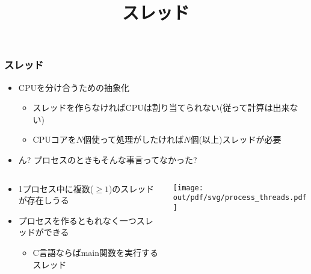 \documentclass[12pt,dvipdfmx]{beamer}
\title{スレッド}
\begin{document}
\maketitle



\begin{frame}
  \frametitle{スレッド}
  \begin{itemize}
  \item CPUを分け合うための抽象化
    \begin{itemize}
    \item スレッドを作らなければCPUは割り当てられない(従って計算は出来ない)
    \item CPUコアを$N$個使って処理がしたければ$N$個(以上)スレッドが必要
    \end{itemize}
  \item ん? プロセスのときもそんな事言ってなかった?
  \end{itemize}
  \begin{columns}
    \begin{column}{0.7\textwidth}
      \begin{itemize}
      \item 1プロセス中に複数($\geq 1$)のスレッドが存在しうる
      \item プロセスを作るともれなく一つスレッドができる
        \begin{itemize}
        \item C言語ならばmain関数を実行するスレッド
        \end{itemize}
      \end{itemize}
    \end{column}
    \begin{column}{0.3\textwidth}
      \texttt{[image: out/pdf/svg/process\_threads.pdf]}
    \end{column}    
  \end{columns}
\end{frame}
\end{document}
